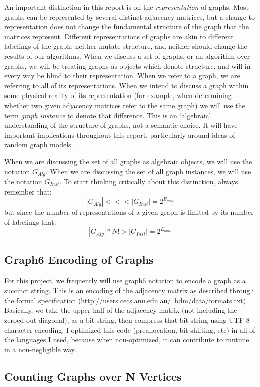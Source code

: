 An important distinction in this report is on the \emph{representation} of graphs.
Most graphs can be represented by several distinct adjacency matrices, but a change to representation does not change the fundamental structure of the graph that the matrices represent.
Different representations of graphs are akin to different labelings of the graph: neither mutate structure, and neither should change the results of our algorithms.
When we discuss a set of graphs, or an algorithm over graphs, we will be treating graphs as objects which denote structure, and will in every way be blind to their representation.
When we refer to a graph, we are referring to all of its representations.
When we intend to discuss a graph within some physical reality of its representation (for example, when determining whether two given adjacency matrices refer to the same graph) we will use the term \emph{graph instance} to denote that difference.
This is an `algebraic' understanding of the structure of graphs, not a semantic choice. 
It will have important implications throughout this report, particularly around ideas of random graph models.

When we are discussing the set of all graphs as algebraic objects, we will use the notation $G_{Alg}$.
When we are discussing the set of all graph instances, we will use the notation $G_{Inst}$.
To start thinking critically about this distinction, always remember that:
$$|G_{Alg}| <<< |G_{Inst}| = 2^{E_{max}}$$
but since the number of representations of a given graph is limited by its number of labelings that:
$$|G_{Alg}| * N! > | G_{Inst} | =  2^{E_{max}}$$

\subsection{Graph6 Encoding of Graphs}

For this project, we frequently will use graph6 notation to encode a graph as a succinct string.
This is an encoding of the adjacency matrix as described through the formal specification (http://users.cecs.anu.edu.au/~bdm/data/formats.txt).
Basically, we take the upper half of the adjacency matrix (not including the zeroed-out diagonal), as a bit-string, then compress that bit-string using UTF-8 character encoding.
I optimized this code (preallocation, bit shifting, etc) in all of the languages I used, because when non-optimized, it can contribute to runtime in a non-negligible way.

\subsection{Counting Graphs over N Vertices}

